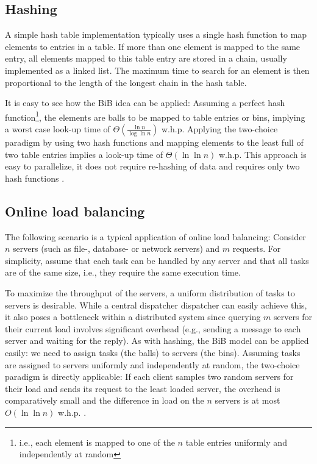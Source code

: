 \documentclass[a4paper,12pt]{article}
\begin{document}
\subsection{Hashing}
\label{sec:hashing}
A simple hash table implementation typically uses a single hash function to map elements to entries in a table. If more than one element is mapped to the same entry, all elements mapped to this table entry are stored in a chain, usually implemented as a linked list. The maximum time to search for an element is then proportional to the length of the longest chain in the hash table. 

It is easy to see how the BiB idea can be applied: Assuming a perfect hash function\footnote{i.e., each element is mapped to one of the $n$ table entries uniformly and independently at random}, the elements are balls to be mapped to table entries or bins, implying a worst case look-up time of $\Theta\left(\frac{\ln n}{\log \ln n}\right)$ w.h.p. Applying the two-choice paradigm by using two hash functions and mapping elements to the least full of two table entries implies a look-up time of $\Theta\left(\ln \ln n\right)$ w.h.p. This approach is easy to parallelize, it does not require re-hashing of data and requires only two hash functions \cite{ABKU99} \cite{MRS01}.

\subsection{Online load balancing}
\label{sec:loadbalancing}
The following scenario is a typical application of online load balancing: Consider $n$ servers (such as file-, database- or network servers) and $m$ requests. For simplicity, assume that each task can be handled by any server and that all tasks are of the same size, i.e., they require the same execution time.

To maximize the throughput of the servers, a uniform distribution of tasks to servers is desirable. While a central dispatcher dispatcher can easily achieve this, it also poses a bottleneck within a distributed system since querying $m$ servers for their current load involves significant overhead (e.g., sending a message to each server and waiting for the reply). As with hashing, the BiB model can be applied easily: we need to assign tasks (the balls) to servers (the bins). Assuming tasks are assigned to servers uniformly and independently at random, the two-choice paradigm is directly applicable: If each client samples two random servers for their load and sends its request to the least loaded server, the overhead is comparatively small and the difference in load on the $n$ servers is at most$O\left(\ln \ln n\right)$ w.h.p. \cite{KLM92} \cite{RS98} \cite{MRS01}.  
\end{document}
